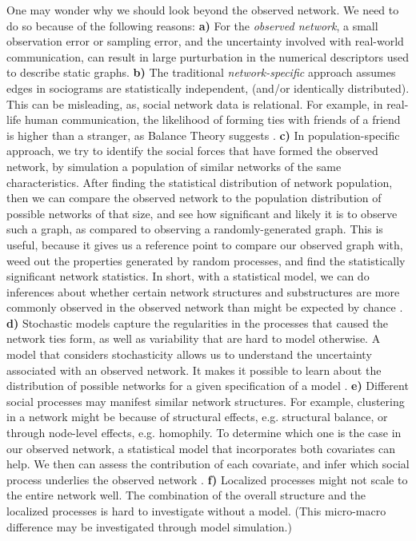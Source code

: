 \documentclass{acm_proc_article-sp}
\begin{document}
One may wonder why we should look beyond the observed network. We need to do so because of the following reasons: \textbf{a)} For the \textit{observed network}, a small observation error or sampling error, and the uncertainty involved with real-world communication, can result in large purturbation in the numerical descriptors used to describe static graphs. \textbf{b)} The traditional \textit{network-specific} approach assumes edges in sociograms are statistically independent, (and/or identically distributed). This can be misleading, as, social network data is relational. For example, in real-life human communication, the likelihood of forming ties with friends of a friend is higher than a stranger, as Balance Theory suggests \cite{Heider}. \textbf{c)} In population-specific approach, we try to identify the social forces that have formed the observed network, by simulation a population of similar networks of the same characteristics. After finding the statistical distribution of network population, then we can compare the observed network to the population distribution of possible networks of that size, and see how significant and likely it is to observe such a graph, as compared to observing a randomly-generated graph. This is useful, because it gives us a reference point to compare our observed graph with, weed out the properties generated by random processes, and find the statistically significant network statistics. In short, with a statistical model, we can do inferences about whether certain network structures and substructures are more commonly observed in the observed network than might be expected by chance \cite{Robins}. \textbf{d)} Stochastic models capture the regularities in the processes that caused the network ties form, as well as variability that are hard to model otherwise. A model that considers stochasticity allows us to understand the uncertainty associated with an observed network. It makes it possible to learn about the distribution of possible networks for a given specification of a model \cite{Robins}. \textbf{e)} Different social processes may manifest similar network structures. For example, clustering in a network might be because of structural effects, e.g. structural balance, or through node-level effects, e.g. homophily. To determine which one is the case in our observed network, a statistical model that incorporates both covariates can help. We then can assess the contribution of each covariate, and infer which social process underlies the observed network \cite{Robins}. \textbf{f)} Localized processes might not scale to the entire network well. The combination of the overall structure and the localized processes is hard to investigate without a model. (This micro-macro difference may be investigated through model simulation.)\cite{Robins}
\end{document}
